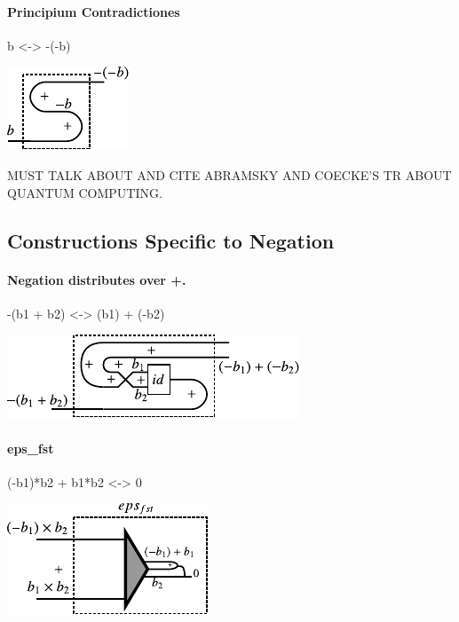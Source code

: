 \documentclass[preprint]{sigplanconf}
\begin{document}
{\paragraph*{Principium Contradictiones}

{{b <-> -(-b)}}

\begin{center}
  \includegraphics{diagrams/double_neg.pdf}
\end{center}

MUST TALK ABOUT AND CITE ABRAMSKY AND COECKE'S TR ABOUT QUANTUM
COMPUTING.


\subsection{Constructions Specific to Negation}
\label{sec:neg-constructions}

\paragraph*{Negation distributes over {{+}}. }

{{-(b1 + b2) <-> (b1) + (-b2)}}

\begin{center}
  \includegraphics{diagrams/dist_neg_plus.pdf}
\end{center}

\paragraph*{ {{eps_{fst} }} }

{{(-b1)*b2 + b1*b2 <-> 0}}

\begin{center}
  \includegraphics{diagrams/eps_fst.pdf}
\end{center}

}
\end{document}
